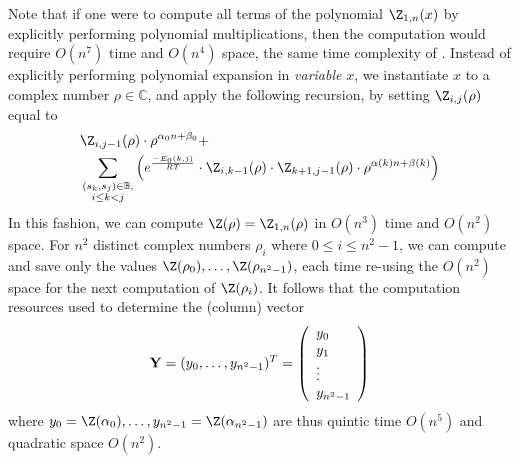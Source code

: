 Note that if one were to compute all terms of the polynomial $\Z_{1,n}(x)$
by explicitly performing polynomial multiplications,
then the computation would require $O(n^7)$ time and $O(n^4)$ space, the
same time complexity of \cite{hofacker:RNAbor2D}.
Instead of explicitly performing polynomial expansion in {\em variable} $x$,
we instantiate $x$ to a
complex number $\rho \in \mathbb{C}$, and apply
the following recursion, by setting $\Z_{i,j}(\rho)$ equal to
\begin{eqnarray}
\label{eqn:RNAborNussRecursionInstantiated}
&\Z_{i,j-1}(\rho) \cdot \rho^{\alpha_0n+\beta_0} + \\
&\sum_{\substack{(s_k,s_j) \in \mathbb{B},\\i\le k<j}}
\left(e^{\frac{-E_0(k,j)}{RT}}\cdot
\Z_{i,k-1}(\rho)\cdot\Z_{k+1,j-1}(\rho)
\cdot \rho^{\alpha(k)n+\beta(k)} \right) \nonumber
\end{eqnarray}
In this fashion, we can compute $\Z(\rho)=\Z_{1,n}(\rho)$ in
$O(n^3)$ time and $O(n^2)$ space. For $n^2$ distinct complex numbers
$\rho_i$ where $0 \leq i \leq n^2-1$, we can compute and save only the
values $\Z(\rho_0),\ldots, \Z(\rho_{n^2-1})$, each time re-using the
$O(n^2)$ space for the next computation of $\Z(\rho_i)$.
It follows that
the computation resources used to determine the (column) vector
\begin{eqnarray}
\label{eqn:defY}
{\bf Y} = (y_0,\ldots,y_{n^2-1})^T =
\left(
\begin{array}{l}
y_0\\
y_1\\
\vdots \\
y_{n^2-1}\\
\end{array}
\right)
\end{eqnarray}
where
$y_0=\Z(\alpha_0),\ldots, y_{n^2-1}=\Z(\alpha_{n^2-1})$ are thus
quintic time $O(n^5)$ and quadratic space $O(n^2)$.

